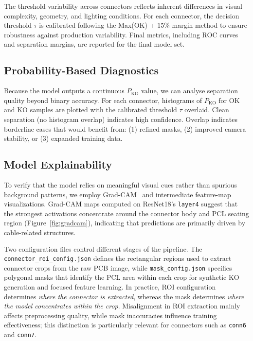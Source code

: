 \documentclass[11pt,a4paper]{article}
\begin{document}
The threshold variability across connectors reflects inherent differences in visual complexity, geometry, and lighting conditions. For each connector, the decision threshold $\tau$ is calibrated following the Max(OK) + 15\% margin method to ensure robustness against production variability. Final metrics, including ROC curves and separation margins, are reported for the final model set.

\subsection{Probability-Based Diagnostics}

Because the model outputs a continuous $P_{\mathrm{KO}}$ value, we can analyse separation quality beyond binary accuracy. For each connector, histograms of $P_{\mathrm{KO}}$ for OK and KO samples are plotted with the calibrated threshold $\tau$ overlaid. Clean separation (no histogram overlap) indicates high confidence. Overlap indicates borderline cases that would benefit from: (1) refined masks, (2) improved camera stability, or (3) expanded training data.

\subsection{Model Explainability}

To verify that the model relies on meaningful visual cues rather than spurious background patterns, we employ Grad-CAM~\cite{selvaraju2017gradcam} and intermediate feature-map visualizations. Grad-CAM maps computed on ResNet18’s \texttt{layer4} suggest that the strongest activations concentrate around the connector body and PCL seating region (Figure~\ref{fig:gradcam}), indicating that predictions are primarily driven by cable-related structures.

Two configuration files control different stages of the pipeline. The \texttt{connector\_roi\_config.json} defines the rectangular regions used to extract connector crops from the raw PCB image, while \texttt{mask\_config.json} specifies polygonal masks that identify the PCL area within each crop for synthetic KO generation and focused feature learning. In practice, ROI configuration determines \emph{where the connector is extracted}, whereas the mask determines \emph{where the model concentrates within the crop}. Misalignment in ROI extraction mainly affects preprocessing quality, while mask inaccuracies influence training effectiveness; this distinction is particularly relevant for connectors such as \texttt{conn6} and \texttt{conn7}.
\end{document}
